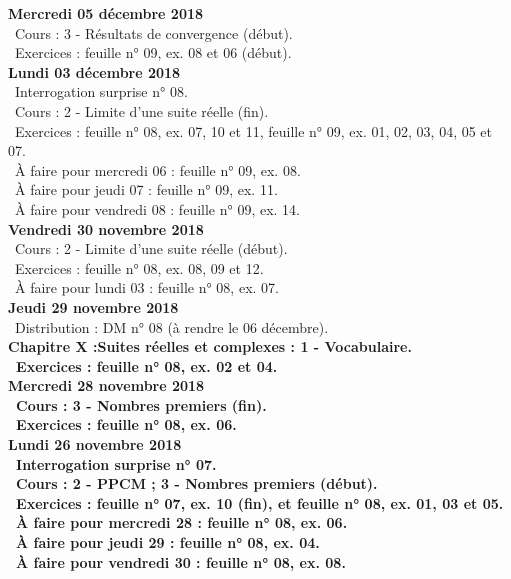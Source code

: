 \documentclass[12pt,a4paper]{article}
\begin{document}
\noindent\textbf{\bf Mercredi 05 décembre 2018}\\
\bu\ Cours : 3 - Résultats de convergence (début).\\
\bu\ Exercices : feuille n° 09, ex. 08 et 06 (début).\vspace{.4cm}\\
 
\noindent\textbf{Lundi 03 décembre 2018}\\
\bu\ Interrogation surprise n° 08.\\
\bu\ Cours : 2 - Limite d'une suite réelle (fin).\\
\bu\ Exercices : feuille n° 08, ex. 07, 10 et 11, feuille n° 09, ex. 01, 02, 03, 04, 05 et 07.\\
\bu\ À faire pour mercredi 06 : feuille n° 09, ex. 08.\\
\bu\ À faire pour jeudi 07 : feuille n° 09, ex. 11.\\
\bu\ À faire pour vendredi 08 : feuille n° 09, ex. 14.\vspace{.4cm}\\
 
\noindent\textbf{Vendredi 30 novembre 2018}\\
\bu\ Cours : 2 - Limite d'une suite réelle (début).\\
\bu\ Exercices : feuille n° 08, ex. 08, 09 et 12.\\
\bu\ À faire pour lundi 03 : feuille n° 08, ex. 07.\vspace{.4cm}\\
 
\noindent\textbf{Jeudi 29 novembre 2018}\\
\bu\ Distribution : DM n° 08 (à rendre le 06 décembre).\\
\bf Chapitre X :\rm Suites réelles et complexes : 1 - Vocabulaire.\\
\bu\ Exercices : feuille n° 08, ex. 02 et 04.\vspace{.4cm}\\
 
\noindent\textbf{\bf Mercredi 28 novembre 2018}\\
\bu\ Cours : 3 - Nombres premiers (fin).\\
\bu\ Exercices : feuille n° 08, ex. 06.\vspace{.4cm}\\
 
\noindent\textbf{Lundi 26 novembre 2018}\\
\bu\ Interrogation surprise n° 07.\\
\bu\ Cours : 2 - PPCM ; 3 - Nombres premiers (début).\\
\bu\ Exercices : feuille n° 07, ex. 10 (fin), et feuille n° 08, ex. 01, 03 et 05.\\
\bu\ À faire pour mercredi 28 : feuille n° 08, ex. 06.\\
\bu\ À faire pour jeudi 29 : feuille n° 08, ex. 04.\\
\bu\ À faire pour vendredi 30 : feuille n° 08, ex. 08.\vspace{.4cm}\\
 
\end{document}
